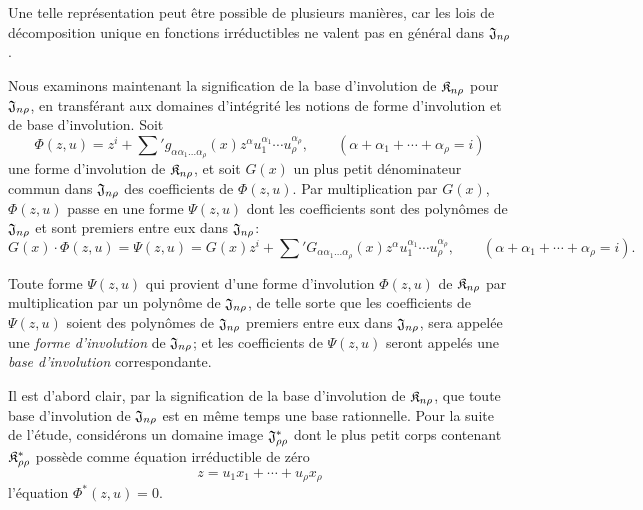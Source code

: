 Une telle représentation peut être possible de plusieurs manières, car les lois de décomposition unique en fonctions irréductibles ne valent pas en général dans $\mathfrak{J}_{n\rho}$.

Nous examinons maintenant la signification de la base d'involution de $\mathfrak{K}_{n\rho}$ pour $\mathfrak{J}_{n\rho}$, en transférant aux domaines d’intégrité les notions de forme d'involution et de base d'involution. Soit
\[
  \Phi(z,u)=z^i+\sum{}' g_{\alpha\alpha_1\ldots\alpha_\rho}(x)
  z^\alpha u_1^{\alpha_1}\cdots u_\rho^{\alpha_\rho},
  \qquad
  (\alpha+\alpha_1+\cdots+\alpha_\rho=i)
\]
une forme d'involution de $\mathfrak{K}_{n\rho}$, et soit $G(x)$ un plus petit dénominateur commun dans $\mathfrak{J}_{n\rho}$ des coefficients de $\Phi(z,u)$. Par multiplication par $G(x)$, $\Phi(z,u)$ passe en une forme $\Psi(z,u)$ dont les coefficients sont des polynômes de $\mathfrak{J}_{n\rho}$ et sont premiers entre eux dans $\mathfrak{J}_{n\rho}$:
\[
  G(x)\cdot\Phi(z,u)=\Psi(z,u)
  =G(x)z^i+
  \sum{}' G_{\alpha\alpha_1\ldots\alpha_\rho}(x)
  z^\alpha u_1^{\alpha_1}\cdots u_\rho^{\alpha_\rho},
  \qquad
  (\alpha+\alpha_1+\cdots+\alpha_\rho=i).
\]

Toute forme $\Psi(z,u)$ qui provient d'une forme d'involution $\Phi(z,u)$ de $\mathfrak{K}_{n\rho}$ par multiplication par un polynôme de $\mathfrak{J}_{n\rho}$, de telle sorte que les coefficients de $\Psi(z,u)$ soient des polynômes de $\mathfrak{J}_{n\rho}$ premiers entre eux dans $\mathfrak{J}_{n\rho}$, sera appelée une \emph{forme d'involution} de $\mathfrak{J}_{n\rho}$; et les coefficients de $\Psi(z,u)$ seront appelés une \emph{base d'involution} correspondante.

Il est d'abord clair, par la signification de la base d'involution de $\mathfrak{K}_{n\rho}$, que toute base d'involution de $\mathfrak{J}_{n\rho}$ est en même temps une base rationnelle. Pour la suite de l'étude, considérons un domaine image $\mathfrak{J}^*_{\rho\rho}$ dont le plus petit corps contenant $\mathfrak{K}^*_{\rho\rho}$ possède comme équation irréductible de zéro
\[
  z=u_1x_1+\cdots+u_\rho x_\rho
\]
l'équation $\Phi^*(z,u)=0$.

